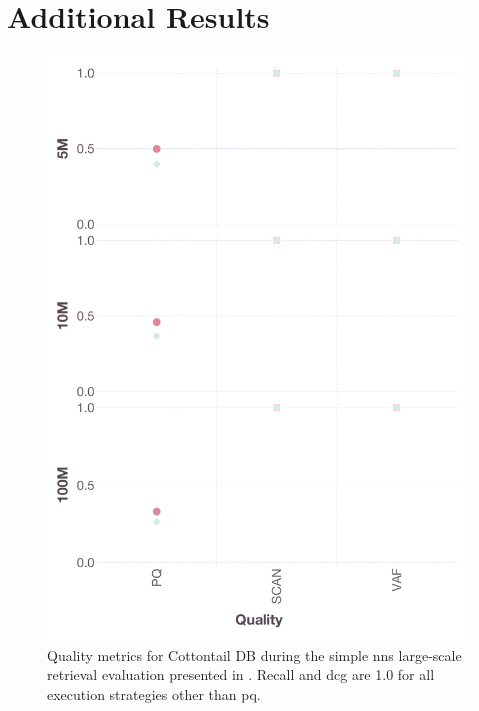 \section*{Additional Results}


\begin{figure}[p]
    \includegraphics[width=\linewidth]{figures/bignns-cottontail-NNS-quality}
    \caption{Quality metrics for Cottontail DB during the simple \acrshort{nns} large-scale retrieval evaluation presented in . Recall and \acrshort{dcg} are 1.0 for all execution strategies other than \acrshort{pq}.}
\end{figure}

